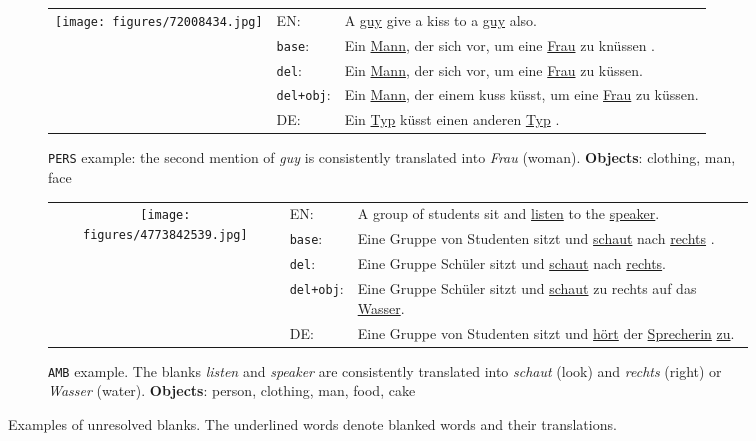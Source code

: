 \documentclass[11pt,a4paper]{article}
\newcommand{\base}{\texttt{base}\xspace}
\newcommand{\delib}{\texttt{del}\xspace}
\newcommand{\delibattobj}{\texttt{del+obj}\xspace}
\newcommand{\amb}{\texttt{AMB}\xspace}
\newcommand{\pers}{\texttt{PERS}\xspace}
\begin{document}
\begin{figure*}[ht]
\small{
  \begin{subfigure}[c]{\textwidth}
  \vspace{1em}
    \begin{tabular}{c p{1.5cm}p{9cm}}
      \multirow{3}[15]{*}{\texttt{[image: figures/72008434.jpg]}} & EN: & A \underline{guy} give a kiss to a \underline{guy} also.\\[1ex]
      & \base: & Ein \underline{Mann}, der sich vor, um eine \underline{Frau} zu kn\"{u}ssen .  \\[1ex]
      & \delib: & Ein \underline{Mann}, der sich vor, um eine \underline{Frau} zu k\"{u}ssen.  \\[1ex]
      & \delibattobj: & Ein \underline{Mann}, der einem kuss k\"{u}sst, um eine \underline{Frau} zu k\"{u}ssen. \\[1ex]
      & DE: & Ein \underline{Typ} k\"{u}sst einen anderen \underline{Typ} .\\[1ex]
  \end{tabular}
  \caption{\pers example: the second mention of \textit{guy} is consistently translated into \textit{Frau} (woman). \textbf{Objects}: clothing, man, face}
  \end{subfigure}
  \begin{subfigure}[c]{\textwidth}
  \vspace{1em}
    \begin{tabular}{c p{1.5cm}p{9cm}}
      \multirow{3}{*}{\texttt{[image: figures/4773842539.jpg]}} & 
      EN: & A group of students sit and \underline{listen} to the \underline{speaker}.\\[1ex]
      & \base: & Eine Gruppe von Studenten sitzt und \underline{schaut} nach \underline{rechts} . \\[1ex]
      & \delib: & Eine Gruppe Sch\"{u}ler sitzt und \underline{schaut} nach \underline{rechts}. \\[1ex]
      & \delibattobj: & Eine Gruppe Sch\"{u}ler sitzt und \underline{schaut} zu rechts auf das \underline{Wasser}. \\[1ex]
      & DE: & Eine Gruppe von Studenten sitzt und \underline{h\"{o}rt} der \underline{Sprecherin} \underline{zu}.  \\[1ex]
  \end{tabular}
  \caption{\amb example. The blanks \textit{listen} and \textit{speaker} are consistently translated into \textit{schaut} (look) and \textit{rechts} (right) or \textit{Wasser} (water). \textbf{Objects}: person, clothing, man, food, cake}
  \end{subfigure}}
\caption{\label{table:gapped_ex3} Examples of unresolved blanks. The underlined words denote blanked words and their translations.}
\end{figure*}
\end{document}
